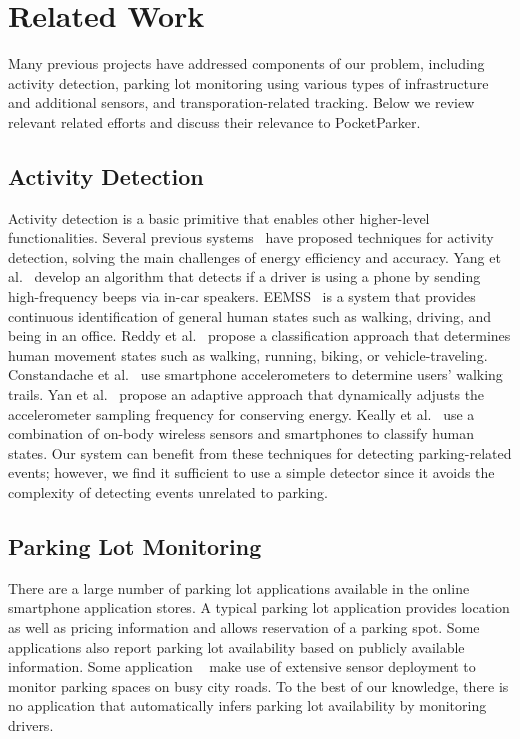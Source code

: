\section{Related Work}
\label{sec-related}

Many previous projects have addressed components of our problem, including
activity detection, parking lot monitoring using various types of
infrastructure and additional sensors, and transporation-related tracking.
Below we review relevant related efforts and discuss their relevance to
PocketParker.

\subsection{Activity Detection}

Activity detection is a basic primitive that enables other higher-level
functionalities. Several previous systems~\cite{Constandache:2010:DYS,
Keally:2011:PTP, Reddy:2010:UMP, Yang:2011:DDP, Wang:2009:FEE} have proposed
techniques for activity detection, solving the main challenges of energy
efficiency and accuracy. Yang et al.~\cite{Yang:2011:DDP} develop an algorithm
that detects if a driver is using a phone by sending high-frequency beeps via
in-car speakers. EEMSS~\cite{Wang:2009:FEE} is a system that provides continuous
identification of general human states such as walking, driving, and being in an
office. Reddy et al.~\cite{Reddy:2010:UMP} propose a classification approach
that determines human movement states such as walking, running, biking, or
vehicle-traveling. Constandache et al.~\cite{Constandache:2010:DYS} use
smartphone accelerometers to determine users' walking trails. Yan et
al.~\cite{6246136} propose an adaptive approach that dynamically adjusts the
accelerometer sampling frequency for conserving energy. Keally et
al.~\cite{Keally:2011:PTP} use a combination of on-body wireless sensors and
smartphones to classify human states. Our system can benefit from these
techniques for detecting parking-related events; however, we find it sufficient
to use a simple detector since it avoids the complexity of detecting events
unrelated to parking.

\subsection{Parking Lot Monitoring}

There are a large number of parking lot applications available in the online
smartphone application stores. A typical parking lot application provides
location as well as pricing information and allows reservation of a parking
spot. Some applications also report parking lot availability based on publicly
available information. Some application ~\cite{parker,sfpark} make use of extensive sensor deployment to monitor parking spaces on busy city roads. To the best of our knowledge, there is no application that automatically infers parking lot availability by monitoring drivers.

